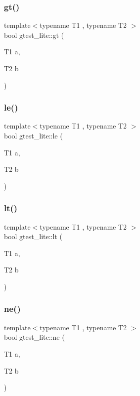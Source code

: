 \subsubsection{\texorpdfstring{gt()}{gt()}}
{\footnotesize\ttfamily template$<$typename T1 , typename T2 $>$ \\
bool gtest\+\_\+lite\+::gt (\begin{DoxyParamCaption}\item[{T1}]{a,  }\item[{T2}]{b }\end{DoxyParamCaption})}

\mbox{\label{namespacegtest__lite_a5cd2ce368021471b16b4814b179c9c34}} 
\subsubsection{\texorpdfstring{le()}{le()}}
{\footnotesize\ttfamily template$<$typename T1 , typename T2 $>$ \\
bool gtest\+\_\+lite\+::le (\begin{DoxyParamCaption}\item[{T1}]{a,  }\item[{T2}]{b }\end{DoxyParamCaption})}

\mbox{\label{namespacegtest__lite_afb471377c0d2d30aeeaf8912db72f0ff}} 
\subsubsection{\texorpdfstring{lt()}{lt()}}
{\footnotesize\ttfamily template$<$typename T1 , typename T2 $>$ \\
bool gtest\+\_\+lite\+::lt (\begin{DoxyParamCaption}\item[{T1}]{a,  }\item[{T2}]{b }\end{DoxyParamCaption})}

\mbox{\label{namespacegtest__lite_a2f36af995c570e62f68c148f7393eb54}} 
\subsubsection{\texorpdfstring{ne()}{ne()}}
{\footnotesize\ttfamily template$<$typename T1 , typename T2 $>$ \\
bool gtest\+\_\+lite\+::ne (\begin{DoxyParamCaption}\item[{T1}]{a,  }\item[{T2}]{b }\end{DoxyParamCaption})}

